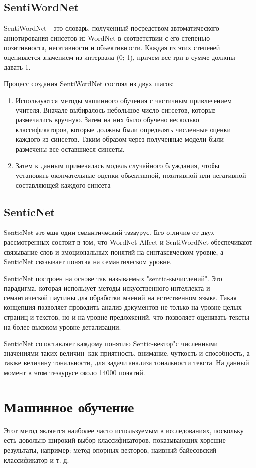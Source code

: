 \subsection{SentiWordNet}
SentiWordNet - это словарь, полученный посредством автоматического аннотирования
синсетов из WordNet в соответствии с его степенью позитивности, негативности и
объективности. Каждая из этих степеней оценивается значением из интервала (0;
1), причем все три в сумме должны давать 1.

Процесс создания SentiWordNet состоял из двух шагов:
\begin{enumerate}
\item Используются методы машинного обучения с частичным привлечением учителя.
  Вначале выбиралось небольшое число синсетов, которые размечались вручную.
  Затем на них было обучено несколько классификаторов, которые должны
  были определять численные оценки каждого из синсетов. Таким образом через
  полученные модели были размечены все оставшиеся синсеты. 
\item Затем к данным применялась модель случайного блуждания, чтобы установить
  окончательные оценки объективной, позитивной или негативной составляющей
  каждого синсета
\end{enumerate}

\subsection{SenticNet}
SenticNet это еще один семантический тезаурус. Его отличие от двух рассмотренных
состоит в том, что WordNet-Affect и SentiWordNet обеспечивают связывание
слов и эмоциональных понятий на синтаксическом уровне, а SenticNet связывает
понятия на семантическом уровне.

SenticNet построен на основе так называемых "sentic-вычислений". Это парадигма,
которая использует методы искусственного интеллекта и семантической паутины для
обработки мнений на естественном языке. Такая концепция позволяет
проводить анализ документов не только на уровне целых страниц и текстов, но и
на уровне предложений, что позволяет оценивать тексты на более высоком уровне
детализации.

SenticNet сопоставляет каждому понятию Sentic-вектор"с численными значениями
таких величин, как приятность, внимание, чуткость и способность, а также
величину тональности, для задачи анализа тональности текста. На данный момент в
этом тезаурусе около 14000 понятий.

\section{Машинное обучение}
Этот метод является наиболее часто используемым в исследованиях, поскольку
есть довольно широкий выбор классификаторов, показывающих хорошие результаты,
например: метод опорных векторов, наивный байесовский классификатор и т. д.

